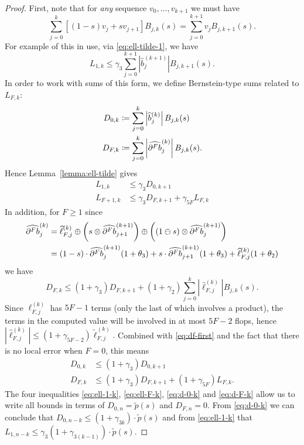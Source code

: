 \begin{proof}
First, note that for \emph{any} sequence \(v_0, \ldots, v_{k + 1}\) we
must have
\begin{equation}
\sum_{j = 0}^k \left[(1 - s) v_j + s v_{j + 1}\right] B_{j, k}(s) =
\sum_{j = 0}^{k + 1} v_j B_{j, k + 1}(s).
\end{equation}
For example of this in use, via \eqref{eq:ell-tilde-1}, we have
\begin{equation}
  L_{1, k} \leq \gamma_3 \sum_{j = 0}^{k + 1} \left|
  \widehat{b}_j^{(k + 1)}\right| B_{j, k + 1}(s).
\end{equation}
In order to work with sums of this form, we define Bernstein-type
sums related to \(L_{F, k}\):
\begin{align}
D_{0, k} &\coloneqq \sum_{j = 0}^k \left|\widehat{b}_j^{(k)}\right|
B_{j, k}(s) \\
D_{F, k} &\coloneqq \sum_{j = 0}^k \left|\cdb{F}_j^{(k)}\right| B_{j, k}(s).
\end{align}
Hence Lemma~\ref{lemma:ell-tilde} gives
\begin{align}
L_{1, k} &\leq \gamma_3 D_{0, k + 1} \label{eq:ell-1-k} \\
L_{F + 1, k} &\leq \gamma_3 D_{F, k + 1} + \gamma_{5F} L_{F, k}
\label{eq:ell-F-k}
\end{align}
In addition, for \(F \geq 1\) since
\begin{align}
\cdb{F}_j^{(k)} &= \widehat{\ell}_{F, j}^{(k)} \oplus \left(
  s \otimes \cdb{F}_{j + 1}^{(k + 1)}\right) \oplus \left((1 \ominus s) \otimes
  \cdb{F}_{j}^{(k + 1)}\right) \\
&= (1 - s) \cdot \cdb{F}_j^{(k + 1)}(1 + \theta_3) +
  s \cdot \cdb{F}_{j + 1}^{(k + 1)}(1 + \theta_3) +
  \widehat{\ell}_{F, j}^{(k)} (1 + \theta_2)
\end{align}
we have
\begin{equation}\label{eq:df-first}
D_{F, k} \leq (1 + \gamma_3) D_{F, k + 1} + (1 + \gamma_2) \sum_{j = 0}^k
\left|\widehat{\ell}_{F, j}^{(k)}\right| B_{j, k}(s).
\end{equation}
Since \(\ell_{F, j}^{(k)}\) has \(5F - 1\) terms (only the last of which
involves a product), the terms in the computed value will be involved in
at most \(5F - 2\) flops, hence
\(\left|\widehat{\ell}_{F, j}^{(k)}\right| \leq
\left(1 + \gamma_{5F - 2}\right) \widetilde{\ell}_{F, j}^{(k)}.\)
Combined with \eqref{eq:df-first} and the fact that there is no local error
when \(F = 0\), this means
\begin{align}
D_{0, k} &\leq (1 + \gamma_3) D_{0, k + 1} \label{eq:d-0-k} \\
D_{F, k} &\leq (1 + \gamma_3) D_{F, k + 1} + (1 + \gamma_{5F}) L_{F, k}.
\label{eq:d-F-k}
\end{align}
The four inequalities \eqref{eq:ell-1-k}, \eqref{eq:ell-F-k}, \eqref{eq:d-0-k}
and \eqref{eq:d-F-k} allow us to write all bounds in terms of
\(D_{0, n} = \widetilde{p}(s)\) and \(D_{F, n} = 0\). From \eqref{eq:d-0-k}
we can conclude that \(D_{0, n - k} \leq \left(1 + \gamma_{3k}\right) \cdot
\widetilde{p}(s)\) and from \eqref{eq:ell-1-k} that \(L_{1, n - k} \leq
\gamma_3 \left(1 + \gamma_{3(k - 1)}\right) \cdot \widetilde{p}(s)\).


\end{proof}
